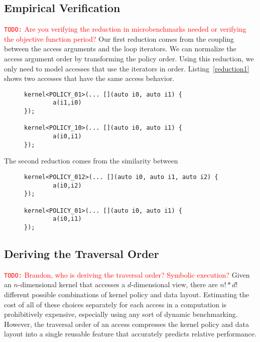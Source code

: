 \documentclass[sigconf, table]{acmart}
\newcommand{\todo}[1]{{\textcolor{red}{{\tt{TODO:}}\,\,#1 }}}
\begin{document}
\subsection{Empirical Verification}

\todo{Are you verifying the reduction in microbenchmarks needed or verifying the objective function period?}
Our first reduction comes from the coupling between the access arguments and the loop iterators. We can normalize the access argument order by transforming the policy order. Using this reduction, we only need to model accesses that use the iterators in order. Listing~\ref{reduction1} shows two accesses that have the same access behavior. 

\begin{figure}
	\begin{lstlisting}[caption={Equivalent loops for first reduction process.}, label={reduction1}]
kernel<POLICY_01>(... [](auto i0, auto i1) {
		a(i1,i0)
});

kernel<POLICY_10>(... [](auto i0, auto i1) {
		a(i0,i1)
});
	\end{lstlisting}
\end{figure}

The second reduction comes from the similarity between 
\begin{figure}
	\begin{lstlisting}[caption={Equivalent loops for second reduction process.}, label={reduction2}]
kernel<POLICY_012>(... [](auto i0, auto i1, auto i2) {
		a(i0,i2)
});

kernel<POLICY_01>(... [](auto i0, auto i1) {
		a(i0,i1)
});
	\end{lstlisting}
\end{figure}


\subsection{Deriving the Traversal Order}

\todo{Brandon, who is deriving the traversal order?  Symbolic execution?}
Given an $n$-dimensional kernel that accesses a $d$-dimensional view, there are $n! * d!$ different possible combinations of kernel policy and data layout. 
Estimating the cost of all of these choices separately for each access in a computation is prohibitively expensive, especially using any sort of dynamic benchmarking. 
However, the traversal order of an access compresses the kernel policy and data layout into a single reusable feature that accurately predicts relative performance.
\end{document}
